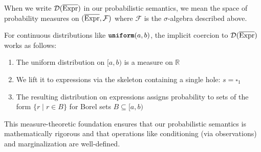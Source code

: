 When we write $\mathcal{D}({\overline{\text{Expr}}})$ in our probabilistic semantics, we mean the space of probability measures on $({\overline{\text{Expr}}}, \mathcal{F})$ where $\mathcal{F}$ is the $\sigma$-algebra described above.

For continuous distributions like $\text{\ttfamily\bfseries uniform}(a, b)$, the implicit coercion to $\mathcal{D}({\overline{\text{Expr}}})$ works as follows:
\begin{enumerate}
    \item The uniform distribution on $[a, b)$ is a measure on $\mathbb{R}$
    \item We lift it to expressions via the skeleton containing a single hole: $s = \square_1$
    \item The resulting distribution on expressions assigns probability to sets of the form $\{r \mid r \in B\}$ for Borel sets $B \subseteq [a, b)$
\end{enumerate}

This measure-theoretic foundation ensures that our probabilistic semantics is mathematically rigorous and that operations like conditioning (via observations) and marginalization are well-defined. 

